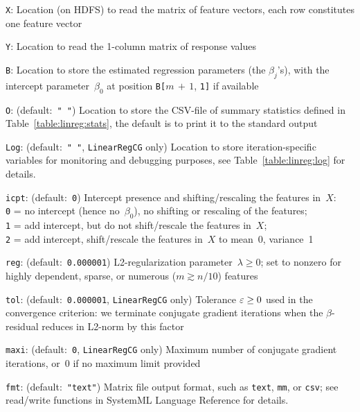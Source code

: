 \smallskip
{}
\begin{Description}
\item[{\tt X}:]
Location (on HDFS) to read the matrix of feature vectors, each row constitutes
one feature vector
\item[{\tt Y}:]
Location to read the 1-column matrix of response values
\item[{\tt B}:]
Location to store the estimated regression parameters (the $\beta_j$'s), with the
intercept parameter~$\beta_0$ at position {\tt B[}$m\,{+}\,1$, {\tt 1]} if available
\item[{\tt O}:] (default:\mbox{ }{\tt " "})
Location to store the CSV-file of summary statistics defined in
Table~\ref{table:linreg:stats}, the default is to print it to the standard output
\item[{\tt Log}:] (default:\mbox{ }{\tt " "}, {\tt LinearRegCG} only)
Location to store iteration-specific variables for monitoring and debugging purposes,
see Table~\ref{table:linreg:log} for details.
\item[{\tt icpt}:] (default:\mbox{ }{\tt 0})
Intercept presence and shifting/rescaling the features in~$X$:\\
{\tt 0} = no intercept (hence no~$\beta_0$), no shifting or rescaling of the features;\\
{\tt 1} = add intercept, but do not shift/rescale the features in~$X$;\\
{\tt 2} = add intercept, shift/rescale the features in~$X$ to mean~0, variance~1
\item[{\tt reg}:] (default:\mbox{ }{\tt 0.000001})
L2-regularization parameter~\mbox{$\lambda\geq 0$}; set to nonzero for highly dependent,
sparse, or numerous ($m \gtrsim n/10$) features
\item[{\tt tol}:] (default:\mbox{ }{\tt 0.000001}, {\tt LinearRegCG} only)
Tolerance \mbox{$\varepsilon\geq 0$} used in the convergence criterion: we terminate conjugate
gradient iterations when the $\beta$-residual reduces in L2-norm by this factor
\item[{\tt maxi}:] (default:\mbox{ }{\tt 0}, {\tt LinearRegCG} only)
Maximum number of conjugate gradient iterations, or~0 if no maximum
limit provided
\item[{\tt fmt}:] (default:\mbox{ }{\tt "text"})
Matrix file output format, such as {\tt text}, {\tt mm}, or {\tt csv};
see read/write functions in SystemML Language Reference for details.
\end{Description}


